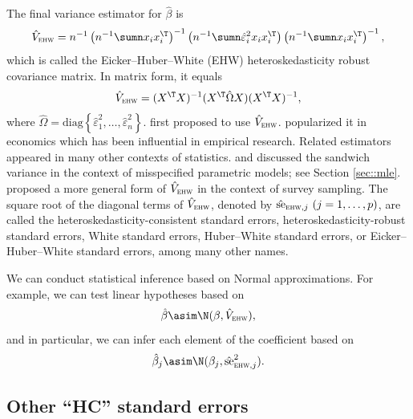 The final variance estimator for $\hat{\beta}$ is 
\[
\hat{V}_{\textsc{ehw}}=n^{-1}\left(n^{-1}\sumn x_{i}x_{i}^{\T}\right)^{-1}\left(n^{-1}\sumn\hat{\varepsilon}_{i}^{2}x_{i}x_{i}^{\T}\right)\left(n^{-1}\sumn x_{i}x_{i}^{\T}\right)^{-1},
\]
 which is called the Eicker--Huber--White (EHW) heteroskedasticity robust covariance matrix.
In matrix form, it equals 
\[
\hat{V}_{\textsc{ehw}} =(X^{\T}X)^{-1}(X^{\T}\hat{\Omega}X)(X^{\T}X)^{-1},
\]
where $\hat{\Omega}=\text{diag}\left\{ \hat{\varepsilon}_{1}^{2},\ldots,\hat{\varepsilon}_{n}^{2}\right\} .$ 
\citet{eicker1967limit} first proposed to use $\hat{V}_{\textsc{ehw}} $.  \citet{white::1980} popularized it in economics which has been influential in empirical research.  Related estimators appeared in many other contexts of statistics.
\citet{cox1961tests} and \citet{huber::1967} discussed the sandwich variance in the context of misspecified parametric models; see Section \ref{sec::mle}. 
\citet{fuller1975regression} proposed a more general form of $\hat{V}_{\textsc{ehw}} $ in the context of survey sampling. 
The square root of the diagonal terms of $\hat{V}_{\textsc{ehw}} $, denoted by $\hat{\text{se}}_{\textsc{ehw},j}\ (j=1,\ldots,p)$, are called the heteroskedasticity-consistent standard errors, heteroskedasticity-robust standard errors, White standard errors, Huber--White standard errors, or Eicker--Huber--White standard errors, among many other names. 

We can conduct statistical inference based on Normal approximations. For example, we can test linear hypotheses based on
$$
\hat{\beta} \asim \N(\beta,  \hat{V}_{\textsc{ehw}}  ),
$$
and in particular, we can infer each element of the coefficient based on 
$$
\hat{\beta}_j \asim \N(\beta_j, \hat{\text{se}}_{\textsc{ehw}, j}^2 ).
$$  



\subsection{Other ``HC'' standard errors}
\label{sec::HCs}


